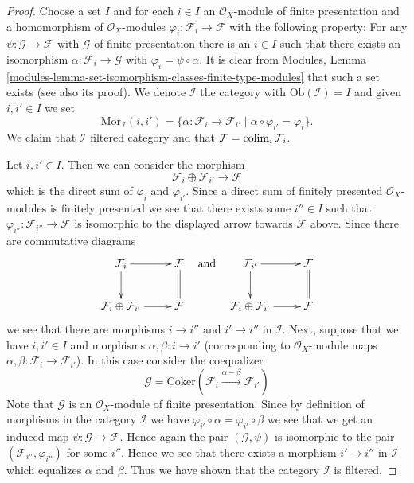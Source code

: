 \begin{proof}
Choose a set $I$ and for each $i \in I$ an $\mathcal{O}_X$-module
of finite presentation and a homomorphism of $\mathcal{O}_X$-modules
$\varphi_i : \mathcal{F}_i \to \mathcal{F}$ with the following
property: For any $\psi : \mathcal{G} \to \mathcal{F}$ with $\mathcal{G}$
of finite presentation there is an $i \in I$ such that there exists
an isomorphism $\alpha : \mathcal{F}_i \to \mathcal{G}$ with
$\varphi_i = \psi \circ \alpha$. It is clear from
Modules, Lemma \ref{modules-lemma-set-isomorphism-classes-finite-type-modules}
that such a set exists (see also its proof).
We denote $\mathcal{I}$ the category
with $\text{Ob}(\mathcal{I}) = I$ and given $i, i' \in I$ 
we set
$$
\text{Mor}_{\mathcal{I}}(i, i') =
\{\alpha : \mathcal{F}_i \to \mathcal{F}_{i'} \mid
\alpha \circ \varphi_{i'} = \varphi_i
\}.
$$
We claim that $\mathcal{I}$ filtered category and that
$\mathcal{F} = \mathop{\rm colim}\nolimits_i \mathcal{F}_i$.

\medskip\noindent
Let $i, i' \in I$. Then we can consider the morphism
$$
\mathcal{F}_i \oplus \mathcal{F}_{i'} \longrightarrow \mathcal{F}
$$
which is the direct sum of $\varphi_i$ and $\varphi_{i'}$.
Since a direct sum of finitely presented $\mathcal{O}_X$-modules
is finitely presented we see that there exists some $i'' \in I$
such that $\varphi_{i''} : \mathcal{F}_{i''} \to \mathcal{F}$
is isomorphic to the displayed arrow towards $\mathcal{F}$ above.
Since there are commutative diagrams
$$
\xymatrix{
\mathcal{F}_i \ar[r] \ar[d] & \mathcal{F} \ar@{=}[d] \\
\mathcal{F}_i \oplus \mathcal{F}_{i'} \ar[r] & \mathcal{F}
}
\quad
\text{and}
\quad
\xymatrix{
\mathcal{F}_{i'} \ar[r] \ar[d] & \mathcal{F} \ar@{=}[d] \\
\mathcal{F}_i \oplus \mathcal{F}_{i'} \ar[r] & \mathcal{F}
}
$$
we see that there are morphisms $i \to i''$ and $i' \to i''$
in $\mathcal{I}$. Next, suppose that we have $i, i' \in I$ and
morphisms $\alpha, \beta : i \to i'$ (corresponding to $\mathcal{O}_X$-module
maps $\alpha, \beta : \mathcal{F}_i \to \mathcal{F}_{i'}$).
In this case consider the coequalizer
$$
\mathcal{G} =
\text{Coker}(
\mathcal{F}_i \xrightarrow{\alpha - \beta} \mathcal{F}_{i'}
)
$$
Note that $\mathcal{G}$ is an $\mathcal{O}_X$-module of finite presentation.
Since by definition of morphisms in the category $\mathcal{I}$
we have $\varphi_{i'} \circ \alpha = \varphi_{i'} \circ \beta$
we see that we get an induced map $\psi : \mathcal{G} \to \mathcal{F}$.
Hence again the pair $(\mathcal{G}, \psi)$ is isomorphic to
the pair $(\mathcal{F}_{i''}, \varphi_{i''})$ for some $i''$.
Hence we see that there exists a morphism $i' \to i''$ in
$\mathcal{I}$ which equalizes $\alpha$ and $\beta$. Thus we have
shown that the category $\mathcal{I}$ is filtered.


\end{proof}
